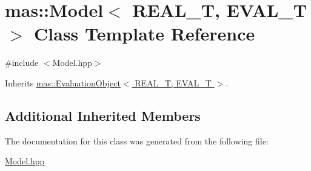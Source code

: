 \hypertarget{classmas_1_1_model}{}\section{mas\+:\+:Model$<$ R\+E\+A\+L\+\_\+\+T, E\+V\+A\+L\+\_\+\+T $>$ Class Template Reference}
\label{classmas_1_1_model}


{\ttfamily \#include $<$Model.\+hpp$>$}



Inherits \hyperlink{classmas_1_1_evaluation_object}{mas\+::\+Evaluation\+Object$<$ R\+E\+A\+L\+\_\+\+T, E\+V\+A\+L\+\_\+\+T $>$}.

\subsection*{Additional Inherited Members}


The documentation for this class was generated from the following file\+:\begin{DoxyCompactItemize}
\item 
\hyperlink{_model_8hpp}{Model.\+hpp}\end{DoxyCompactItemize}
